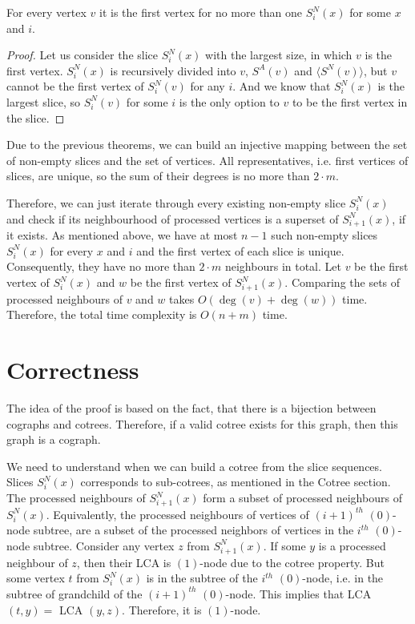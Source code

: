 \begin{theorem}
    For every vertex $v$ it is the first vertex for no more than one $S^N_i(x)$ for some $x$ and $i$.
\end{theorem}
\begin{proof}
    Let us consider the slice $S^N_i(x)$ with the largest size, in which $v$ is the first vertex. $S^N_i(x)$ is recursively divided into $v$, $S^A(v)$ and $\langle S^N(v) \rangle$, but $v$ cannot be the first vertex of $S^N_i(v)$ for any $i$. And we know that $S^N_i(x)$ is the largest slice, so $S^N_i(v)$ for some $i$ is the only option to $v$ to be the first vertex in the slice.
\end{proof}

Due to the previous theorems, we can build an injective mapping between the set of non-empty slices and the set of vertices. All representatives, i.e. first vertices of slices, are unique, so the sum of their degrees is no more than $2 \cdot m$.

Therefore, we can just iterate through every existing non-empty slice $S^N_i(x)$ and check if its neighbourhood of processed vertices is a superset of $S^N_{i+1}(x)$, if it exists. As mentioned above, we have at most $n-1$ such non-empty slices $S^N_i(x)$ for every $x$ and $i$ and the first vertex of each slice is unique. Consequently, they have no more than $2 \cdot m$ neighbours in total. Let $v$ be the first vertex of $S^N_i(x)$ and $w$ be the first vertex of $S^N_{i+1}(x)$. Comparing the sets of processed neighbours of $v$ and $w$ takes $O(\deg(v) + \deg(w))$ time. Therefore, the total time complexity is $O(n+m)$ time. 
\section{Correctness}
\label{correctness_lexbfs}
The idea of the proof is based on the fact, that there is a bijection between cographs and cotrees. Therefore, if a valid cotree exists for this graph, then this graph is a cograph. 

We need to understand when we can build a cotree from the slice sequences. Slices $S^N_i(x)$ corresponds to sub-cotrees, as mentioned in the Cotree section. The processed neighbours of $S^N_{i+1}(x)$ form a subset of processed neighbours of $S^N_i(x)$. Equivalently, the processed neighbours of vertices of $(i+1)^{th}$ $(0)$-node subtree, are a subset of the processed neighbors of vertices in the $i^{th}$ $(0)$-node subtree. Consider any vertex $z$ from $S^N_{i+1}(x)$. If some $y$ is a processed neighbour of $z$, then their LCA is $(1)$-node due to the cotree property. But some vertex $t$ from $S^N_i(x)$ is in the subtree of the $i^{th}$ $(0)$-node, i.e. in the subtree of grandchild of the $(i+1)^{th}$ $(0)$-node. This implies that LCA$(t,y) = $ LCA $(y,z)$. Therefore, it is $(1)$-node. 

